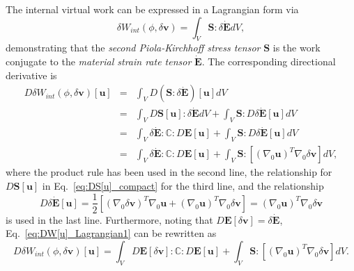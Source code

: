 \documentclass[12pt,aps,pre]{revtex4}
\begin{document}
The internal virtual work can be expressed in a Lagrangian form via
%
\begin{equation}
\delta W_{int}(\phi,\delta \pmb{v}) = \int_V \pmb{S} : \delta \dot{\pmb{E}}dV,
\end{equation}
%
demonstrating that the \textit{second Piola-Kirchhoff stress tensor} $\pmb{S}$ is the work conjugate to the \textit{material strain rate tensor} $\dot{\pmb{E}}$. The corresponding directional derivative is
%
\begin{eqnarray}
D\delta W_{int}(\phi,\delta \pmb{v})[\pmb{u}] &=& \int_V D(\pmb{S}:\delta \dot{\pmb{E}})[\pmb{u}]dV \nonumber\\
%
&=& \int_V D\pmb{S}[\pmb{u}]:\delta \dot{\pmb{E}}dV +  \int_V \pmb{S}: D\delta \dot{\pmb{E}}[\pmb{u}]dV \nonumber\\
%
&=& \int_V \delta \dot{\pmb{E}}:\pmb{\mathbb{C}}:D\pmb{E}[\pmb{u}] +  \int_V \pmb{S}: D\delta \dot{\pmb{E}}[\pmb{u}]dV \nonumber\\
%
&=& \int_V \delta \dot{\pmb{E}}:\pmb{\mathbb{C}}:D\pmb{E}[\pmb{u}] +  \int_V \pmb{S}: [(\nabla_0 \pmb{u})^T \nabla_0\delta \pmb{v}]dV,
\label{eq:DW[u]_Lagrangian1}
\end{eqnarray}
%
where the product rule has been used in the second line, the relationship for $D\pmb{S}[\pmb{u}]$ in Eq.\ \eqref{eq:DS[u]_compact} for the third line, and the relationship
%
\begin{equation}
D\delta \dot{\pmb{E}}[\pmb{u}] = \frac{1}{2}[(\nabla_0 \delta \pmb{v})^T\nabla_0 \pmb{u} + (\nabla_0 \pmb{u})^T\nabla_0\delta \pmb{v}]
%
= (\nabla_0 \pmb{u})^T \nabla_0\delta \pmb{v}
\end{equation}
%
is used in the last line. Furthermore, noting that $D\pmb{E}[\delta \pmb{v}] = \delta \dot{\pmb{E}}$, Eq.\ \eqref{eq:DW[u]_Lagrangian1} can be rewritten as
%
\begin{equation}
D\delta W_{int}(\phi,\delta \pmb{v})[\pmb{u}] = \int_V D\pmb{E}[\delta\pmb{v}] :\pmb{\mathbb{C}}:D\pmb{E}[\pmb{u}] +  \int_V \pmb{S}: [(\nabla_0 \pmb{u})^T \nabla_0\delta \pmb{v}]dV.
\label{eq:DW[u]_Lagrangian}
\end{equation}
%
\end{document}
